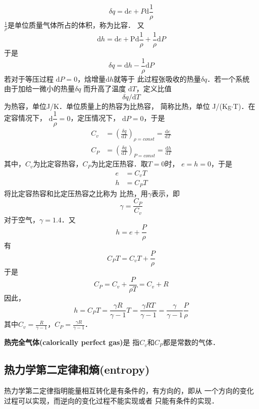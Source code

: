 \begin{equation}
	\delta q =\mathrm{d}e +P \mathrm{d} \frac{1}{\rho}
	\label{eq:4}
\end{equation}
$\frac{1}{\rho}$是单位质量气体所占的体积，称为比容．
又
\[
	\mathrm{d}h =\mathrm{d} e+\mathrm{Pd}\frac{1}{\rho}+\frac{1}{\rho}\mathrm{d}P
\]
于是
\[
	\delta q =\mathrm{d} h-\frac{1}{\rho}\mathrm{d}P
\]
若对于等压过程 $\mathrm{d}P=0$，焓增量$\mathrm{d}h$就等于
此过程张吸收的热量$\delta q$．若一个系统
由于加给一微小的热量$\delta q$ 而升高了温度
$\mathrm{d} T$，定义比值
\[
	\delta q /\mathrm{d}T
\]
为热容，单位J/K．单位质量上的热容为比热容，
简称比热，单位 J/(Kg$\cdot$T)．在定容情况下，
$\mathrm{d} \dfrac{1}{\rho}=0$，定压情况下，
$\mathrm{d}P=0$，于是
\begin{equation}
	\begin{split}
		C_v & =\left(\frac{\delta q}{\mathrm{d} T}\right)_{\rho=const}=\frac{\mathrm{d}e}{\mathrm{d}T} \\
		C_P & =\left(\frac{\delta q}{\mathrm{d} T}\right)_{P=const}=\frac{\mathrm{d}h}{\mathrm{d}T}
		\label{eq:5 }
	\end{split}
\end{equation}
其中，$C_v$为比定容热容，$C_P$为比定压热容．取$T=0$时，
$e=h=0$，于是
\begin{align}
	e & =C_vT  \\
	h & =C_P T
\end{align}
将比定容热容和比定压热容之比称为
比热，用$\gamma$表示，即
\[
	\gamma=\frac{C_P}{C_v}
\]
对于空气，$\gamma=1.4$．又
\[
	h=e+\frac{P}{\rho}
\]
有
\[
	C_P T=C_v T+\frac{P}{\rho}
\]
于是
\[
	C_P=C_v+\frac{P}{\rho T}=C_v+R
\]
因此，
\[
	h=C_P T=\frac{\gamma R}{\gamma-1}T=\frac{\gamma RT}{\gamma-1}=\frac{\gamma}{\gamma-1}\frac{P}{\rho}
\]
其中$C_v=\frac{R}{\gamma-1 }$，$C_P=\frac{\gamma R}{\gamma-1}$．

\begin{notice}
  {\bfseries 热完全气体(calorically perfect gas)}是
	指$C_v$和$C_P$都是常数的气体．
\end{notice}


\subsection{热力学第二定律和熵(entropy)}
热力学第二定律指明能量相互转化是有条件的，有方向的，即从
一个方向的变化过程可以实现，而逆向的变化过程不能实现或者
只能有条件的实现．

